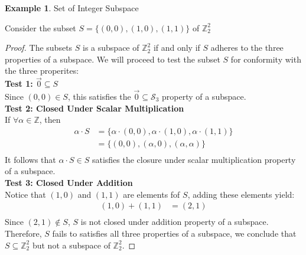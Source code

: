 \documentclass{book}
\theoremstyle{definition}
\newtheorem{example}{Example}[definition]
\theoremstyle{remark}
\newcommand{\bb}[1]{\mathbb{#1}}
\newcommand{\cc}[1]{\mathcal{#1}}
\newcommand{\m}{\cdot}
\begin{document}
\begin{example}
Set of Integer Subspace

    \begin{tcolorbox}
        Consider the subset $S = \{ (0,0), (1,0), (1,1) \}$ of $\bb{Z}_2^2$
    \end{tcolorbox}
    
    \begin{proof}
        The subsets $S$ is a subspace of $\bb{Z}_2^2$ if and only if $S$ adheres to the three properties of a subspace. We will proceed to test the subset $S$ for conformity with the three properites: \\
    
        \textbf{Test 1: $\vec{0} \subseteq S$} \\
            Since $(0,0) \in S$, this satisfies the $\vec{0} \subseteq \cc{S}_3$ property of a subspace. \\
            
        \textbf{Test 2: Closed Under Scalar Multiplication} \\
            If $\forall \alpha \in \bb{Z}$, then  
                \begin{align*}
                    \alpha \m S & = \{ \alpha \m (0,0), \alpha \m (1,0), \alpha \m (1,1) \} \\
                        & = \{ (0,0), (\alpha, 0), (\alpha, \alpha) \} \\
                \end{align*}
            It follows that $\alpha \m S \in S$ satisfies the closure under scalar multiplication property of a subspace. \\
        
        \textbf{Test 3: Closed Under Addition} \\
            Notice that $(1,0)$ and $(1,1)$ are elements fof $S$, adding these elements yield: \\
                \begin{align*}
                    (1,0) + (1,1) & = (2,1) \\
                \end{align*}
            Since $(2,1) \notin S$, $S$ is not closed under addition property of a subspace. \\
        
        Therefore, $S$ fails to satisfies all three properties of a subspace, we conclude that $S \subseteq \bb{Z}_2^2$ but not a subspace of $\bb{Z}_2^2$.
    \end{proof}
\end{example}
\end{document}
